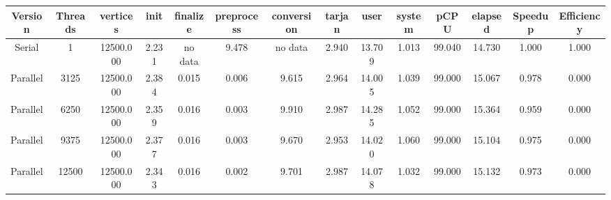 \begin{tabular}{|c|c|c|c|c|c|c|c|c|c|c|c|c|c|}
\toprule
 Version &  Threads &  vertices &  init & finalize &  preprocess & conversion &  tarjan &   user &  system &   pCPU &  elapsed &  Speedup &  Efficiency \\
\midrule
  Serial &        1 & 12500.000 & 2.231 &  no data &       9.478 &    no data &   2.940 & 13.709 &   1.013 & 99.040 &   14.730 &    1.000 &       1.000 \\
Parallel &     3125 & 12500.000 & 2.384 &    0.015 &       0.006 &      9.615 &   2.964 & 14.005 &   1.039 & 99.000 &   15.067 &    0.978 &       0.000 \\
Parallel &     6250 & 12500.000 & 2.359 &    0.016 &       0.003 &      9.910 &   2.987 & 14.285 &   1.052 & 99.000 &   15.364 &    0.959 &       0.000 \\
Parallel &     9375 & 12500.000 & 2.377 &    0.016 &       0.003 &      9.670 &   2.953 & 14.020 &   1.060 & 99.000 &   15.104 &    0.975 &       0.000 \\
Parallel &    12500 & 12500.000 & 2.343 &    0.016 &       0.002 &      9.701 &   2.987 & 14.078 &   1.032 & 99.000 &   15.132 &    0.973 &       0.000 \\
\bottomrule
\end{tabular}
